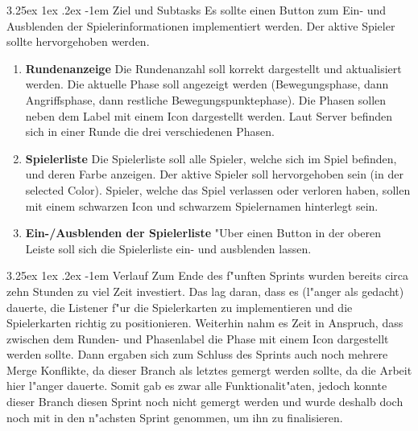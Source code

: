 \documentclass[12pt, titlepage]{scrartcl}
\makeatletter
\renewcommand\paragraph{\@startsection{paragraph}{5}{\z@}%
  {3.25ex \@plus1ex \@minus.2ex}%
  {-1em}%
  {\normalfont\normalsize\bfseries}}
\makeatother
\begin{document}
	            \paragraph{Ziel und Subtasks}
	                Es sollte einen Button zum Ein- und Ausblenden der Spielerinformationen implementiert werden. Der aktive Spieler sollte hervorgehoben werden.
	            	\begin{enumerate}[label={}]
	            		\item \textbf{Rundenanzeige} \hspace{5pt} Die Rundenanzahl soll korrekt dargestellt und aktualisiert werden. Die aktuelle Phase soll angezeigt werden (Bewegungsphase, dann Angriffsphase, dann restliche Bewegungspunktephase). Die Phasen sollen neben dem Label mit einem Icon dargestellt werden. Laut Server befinden sich in einer Runde die drei verschiedenen Phasen.
	            		\item \textbf{Spielerliste} \hspace{5pt} Die Spielerliste soll alle Spieler, welche sich im Spiel befinden, und deren Farbe anzeigen. Der aktive Spieler soll hervorgehoben sein (in der selected Color). Spieler, welche das Spiel verlassen oder verloren haben, sollen mit einem schwarzen Icon und schwarzem Spielernamen hinterlegt sein.
	            		\item \textbf{Ein-/Ausblenden der Spielerliste} \hspace{5pt} "Uber einen Button in der oberen Leiste soll sich die Spielerliste ein- und ausblenden lassen.
	            	\end{enumerate}
            	\paragraph{Verlauf}
            		Zum Ende des f"unften Sprints wurden bereits circa zehn Stunden zu viel Zeit investiert. Das lag daran, dass es (l"anger als gedacht) dauerte, die Listener f"ur die Spielerkarten zu implementieren und die Spielerkarten richtig zu positionieren. Weiterhin nahm es Zeit in Anspruch, dass zwischen dem Runden- und Phasenlabel die Phase mit einem Icon dargestellt werden sollte. Dann ergaben sich zum Schluss des Sprints auch noch mehrere Merge Konflikte, da dieser Branch als letztes gemergt werden sollte, da die Arbeit hier l"anger dauerte. Somit gab es zwar alle Funktionalit"aten, jedoch konnte dieser Branch diesen Sprint noch nicht gemergt werden und wurde deshalb doch noch mit in den n"achsten Sprint genommen, um ihn zu finalisieren.
\end{document}
